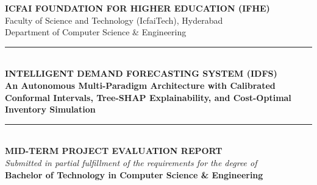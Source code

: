 \documentclass[12pt,a4paper,oneside]{report}
\theoremstyle{definition}
\begin{document}
\begin{titlepage}
    \centering
    \vspace*{0.5cm}
    
    {\Large \textbf{ICFAI FOUNDATION FOR HIGHER EDUCATION (IFHE)}}\\[0.2cm]
    {\large Faculty of Science and Technology (IcfaiTech), Hyderabad}\\[0.2cm]
    {\normalsize Department of Computer Science \& Engineering}\\[1.5cm]
    
    \rule{\linewidth}{1.2pt}\\[0.4cm]
    {\LARGE \textbf{INTELLIGENT DEMAND FORECASTING SYSTEM (IDFS)}}\\[0.3cm]
    {\large \textbf{An Autonomous Multi-Paradigm Architecture with Calibrated Conformal Intervals, Tree-SHAP Explainability, and Cost-Optimal Inventory Simulation}}\\[0.2cm]
    \rule{\linewidth}{1.2pt}\\[1.2cm]
    
    {\large \textbf{MID-TERM PROJECT EVALUATION REPORT}}\\[0.3cm]
    \textit{Submitted in partial fulfillment of the requirements for the degree of}\\[0.2cm]
    \textbf{Bachelor of Technology in Computer Science \& Engineering}\\[1.2cm]
    

\end{titlepage}
\end{document}
